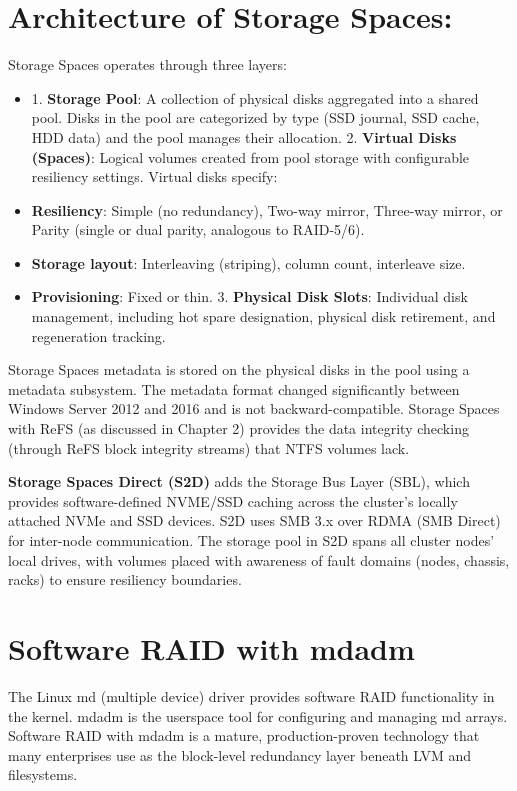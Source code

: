 \section{Architecture of Storage Spaces:}
Storage Spaces operates through three layers:

\begin{itemize}
  \item 1. \textbf{Storage Pool}: A collection of physical disks aggregated into a shared pool. Disks in the pool are categorized by type (SSD journal, SSD cache, HDD data) and the pool manages their allocation.
2. \textbf{Virtual Disks (Spaces)}: Logical volumes created from pool storage with configurable resiliency settings. Virtual disks specify:
  \item \textbf{Resiliency}: Simple (no redundancy), Two-way mirror, Three-way mirror, or Parity (single or dual parity, analogous to RAID-5/6).
  \item \textbf{Storage layout}: Interleaving (striping), column count, interleave size.
  \item \textbf{Provisioning}: Fixed or thin.
3. \textbf{Physical Disk Slots}: Individual disk management, including hot spare designation, physical disk retirement, and regeneration tracking.
\end{itemize}

Storage Spaces metadata is stored on the physical disks in the pool using a metadata subsystem. The metadata format changed significantly between Windows Server 2012 and 2016 and is not backward-compatible. Storage Spaces with ReFS (as discussed in Chapter 2) provides the data integrity checking (through ReFS block integrity streams) that NTFS volumes lack.

\textbf{Storage Spaces Direct (S2D)} adds the Storage Bus Layer (SBL), which provides software-defined NVME/SSD caching across the cluster's locally attached NVMe and SSD devices. S2D uses SMB 3.x over RDMA (SMB Direct) for inter-node communication. The storage pool in S2D spans all cluster nodes'{} local drives, with volumes placed with awareness of fault domains (nodes, chassis, racks) to ensure resiliency boundaries.

\section{Software RAID with mdadm}
The Linux md (multiple device) driver provides software RAID functionality in the kernel. mdadm is the userspace tool for configuring and managing md arrays. Software RAID with mdadm is a mature, production-proven technology that many enterprises use as the block-level redundancy layer beneath LVM and filesystems.

